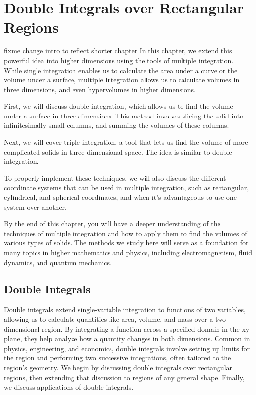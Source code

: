 \chapter{Double Integrals over Rectangular Regions}

fixme change intro to reflect shorter chapter
In this chapter, we extend this powerful idea into higher dimensions using the 
tools of multiple integration. While single integration enables us to calculate
the area under a curve or the volume under a surface, multiple integration 
allows us to calculate volumes in three dimensions, and even hypervolumes in 
higher dimensions.

First, we will discuss double integration, which allows us to find the volume 
under a surface in three dimensions. This method involves slicing the solid 
into infinitesimally small columns, and summing the volumes of these columns.

Next, we will cover triple integration, a tool that lets us find the volume of 
more complicated solids in three-dimensional space. The idea is similar to 
double integration.

To properly implement these techniques, we will also discuss the different 
coordinate systems that can be used in multiple integration, such as 
rectangular, cylindrical, and spherical coordinates, and when it's advantageous
to use one system over another.

By the end of this chapter, you will have a deeper understanding of the 
techniques of multiple integration and how to apply them to find the volumes 
of various types of solids. The methods we study here will serve as a 
foundation for many topics in higher mathematics and physics, including 
electromagnetism, fluid dynamics, and quantum mechanics.

\section{Double Integrals}
Double integrals extend single-variable integration to functions of two 
variables, allowing us to calculate quantities like area, volume, and mass 
over a two-dimensional region. By integrating a function across a specified 
domain in the xy-plane, they help analyze how a quantity changes in both 
dimensions. Common in physics, engineering, and economics, double integrals 
involve setting up limits for the region and performing two successive 
integrations, often tailored to the region's geometry. We begin by discussing 
double integrals over rectangular regions, then extending that discussion to 
regions of any general shape. Finally, we discuss applications of double 
integrals. 

